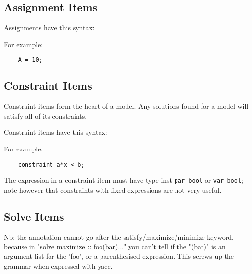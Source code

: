 \documentclass[10pt]{scrartcl}
\newcommand{\pjs}[1]{\textcolor{blue}{PJS:#1}}
\begin{document}

\subsection{Assignment Items}
     \label{Assignments}
Assignments have this syntax:
\begin{productions}
    \RuleAssignItem
\end{productions}
For example:
\begin{verbatim}
    A = 10;
\end{verbatim}


\subsection{Constraint Items}
     \label{Constraint Items}
Constraint items form the heart of a model.  Any solutions found for a model
will satisfy all of its constraints.

Constraint items have this syntax:
\begin{productions}
    \RuleConstraintItem
\end{productions}
For example:
\begin{verbatim}
    constraint a*x < b;
\end{verbatim}

The expression in a constraint item must have type-inst \texttt{par bool} or
\texttt{var bool}; note however that constraints with fixed expressions are
not very useful.

\subsection{Solve Items}
     \label{Solve Items}
{Nb: the annotation cannot go after the satisfy/maximize/minimize keyword,
because in "solve maximize :: foo(bar)..."  you can't tell if the "(bar)" is
an argument list for the 'foo', or a parenthesised expression.  This screws
up the grammar when expressed with yacc.}{}
\end{document}
